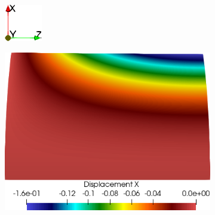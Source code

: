 \begin{figure}[h!]
    \centering
    \caption{Campos de deslocamentos obtido na simulação de \textit{Scordelis-Lo roof}.}
    \begin{subfigure}{0.05\textwidth}
        \includegraphics[width=\linewidth]{Figuras/scordelis/eixos.png}
    \end{subfigure}
    \begin{subfigure}{0.31\textwidth}
        \includegraphics[width=\linewidth]{Figuras/scordelis/ux.png}

\end{subfigure}
\end{figure}
